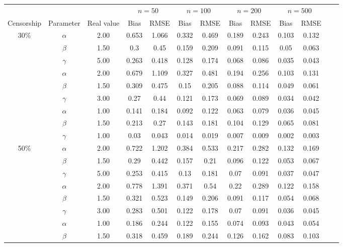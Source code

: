 \documentclass[10pt,a4paper,onecolumn]{article} %
\begin{document}
\begin{table}[H]
\centering
\begin{tabular}{ccccccccccccc}
  \hline
  \multicolumn{3}{c}{} & \multicolumn{2}{c}{$n=50$} & \multicolumn{2}{c}{$n=100$} & \multicolumn{2}{c}{$n=200$} & \multicolumn{2}{c}{$n=500$} 
  \\
Censorship & Parameter & Real value & Bias & RMSE & Bias & RMSE & Bias & RMSE & Bias & RMSE \\ 
\hline
30\% & $\alpha$ & 2.00 & 0.653 & 1.066 & 0.332 & 0.469 & 0.189 & 0.243 & 0.103 & 0.132 \\ 
   & $\beta$ & 1.50 & 0.3 & 0.45 & 0.159 & 0.209 & 0.091 & 0.115 & 0.05 & 0.063 \\ 
   & $\gamma$ & 5.00 & 0.263 & 0.418 & 0.128 & 0.174 & 0.068 & 0.086 & 0.035 & 0.043 \\ \cmidrule{2-11}
   & $\alpha$ & 2.00 & 0.679 & 1.109 & 0.327 & 0.481 & 0.194 & 0.256 & 0.103 & 0.131 \\ 
   & $\beta$ & 1.50 & 0.309 & 0.475 & 0.15 & 0.205 & 0.088 & 0.114 & 0.049 & 0.061 \\ 
   & $\gamma$ & 3.00 & 0.27 & 0.44 & 0.121 & 0.173 & 0.069 & 0.089 & 0.034 & 0.042 \\ \cmidrule{2-11}
   & $\alpha$ & 1.00 & 0.141 & 0.184 & 0.092 & 0.122 & 0.063 & 0.079 & 0.036 & 0.045 \\ 
   & $\beta$ & 1.50 & 0.213 & 0.27 & 0.143 & 0.181 & 0.104 & 0.129 & 0.065 & 0.081 \\ 
   & $\gamma$ & 1.00 & 0.03 & 0.043 & 0.014 & 0.019 & 0.007 & 0.009 & 0.002 & 0.003 \\ 
  \hline
50\% & $\alpha$ & 2.00 & 0.722 & 1.202 & 0.384 & 0.533 & 0.217 & 0.282 & 0.132 & 0.169 \\ 
   & $\beta$ & 1.50 & 0.29 & 0.442 & 0.157 & 0.21 & 0.096 & 0.122 & 0.053 & 0.067 \\ 
   & $\gamma$ & 5.00 & 0.253 & 0.415 & 0.13 & 0.181 & 0.07 & 0.091 & 0.037 & 0.047 \\ \cmidrule{2-11}
   & $\alpha$ & 2.00 & 0.778 & 1.391 & 0.371 & 0.54 & 0.22 & 0.289 & 0.122 & 0.158 \\ 
   & $\beta$ & 1.50 & 0.321 & 0.523 & 0.149 & 0.206 & 0.091 & 0.117 & 0.054 & 0.068 \\ 
   & $\gamma$ & 3.00 & 0.283 & 0.501 & 0.122 & 0.178 & 0.07 & 0.091 & 0.036 & 0.045 \\ \cmidrule{2-11}
   & $\alpha$ & 1.00 & 0.186 & 0.244 & 0.122 & 0.155 & 0.074 & 0.093 & 0.043 & 0.054 \\ 
   & $\beta$ & 1.50 & 0.318 & 0.459 & 0.189 & 0.244 & 0.126 & 0.162 & 0.083 & 0.103 \\ 

\end{tabular}
\end{table}
\end{document}
